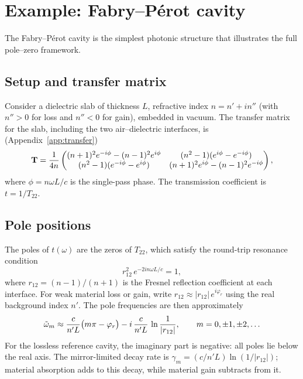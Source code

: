 \section{Example: Fabry--P\'erot cavity}
\label{sec:fabry-perot-poles}

The Fabry--P\'erot cavity is the simplest photonic structure that
illustrates the full pole--zero framework.

\subsection{Setup and transfer matrix}
\label{ssec:fp-setup}

Consider a dielectric slab of thickness $L$, refractive index
$n = n' + in''$ (with $n'' > 0$ for loss and $n'' < 0$ for gain),
embedded in vacuum. The transfer matrix for the slab, including the two
air--dielectric interfaces, is (Appendix~\ref{app:transfer})
\begin{equation}
 \mathbf{T} = \frac{1}{4n}\begin{pmatrix}
 (n+1)^2 e^{-i\phi} - (n-1)^2 e^{i\phi} & (n^2-1)(e^{i\phi}-e^{-i\phi}) \\
 (n^2-1)(e^{-i\phi}-e^{i\phi}) & (n+1)^2 e^{i\phi} - (n-1)^2 e^{-i\phi}
 \end{pmatrix},
 \label{eq:fp-transfer}
\end{equation}
where $\phi = n\omega L/c$ is the single-pass phase. The transmission
coefficient is $t = 1/T_{22}$.

\subsection{Pole positions}
\label{ssec:fp-poles}

The poles of $t(\omega)$ are the zeros of $T_{22}$, which satisfy the
round-trip resonance condition
\begin{equation}
 r_{12}^2\,e^{-2in\omega L/c} = 1,
 \label{eq:fp-roundtrip}
\end{equation}
where $r_{12} = (n-1)/(n+1)$ is the Fresnel reflection coefficient at
each interface. For weak material loss or gain, write
$r_{12} \approx |r_{12}|\,e^{i\varphi_r}$ using the real background
index $n'$. The pole frequencies are then approximately
\begin{equation}
 \tilde{\omega}_m \approx \frac{c}{n' L}\bigl(m\pi - \varphi_r\bigr)
 - i\,\frac{c}{n' L}\,\ln\frac{1}{|r_{12}|},
 \qquad m = 0, \pm 1, \pm 2, \ldots
 \label{eq:fp-poles}
\end{equation}
For the lossless reference cavity, the imaginary part is negative: all
poles lie below the real axis. The mirror-limited decay rate is
$\gamma_m = (c/n'L)\ln(1/|r_{12}|)$; material absorption adds to this
decay, while material gain subtracts from it.

